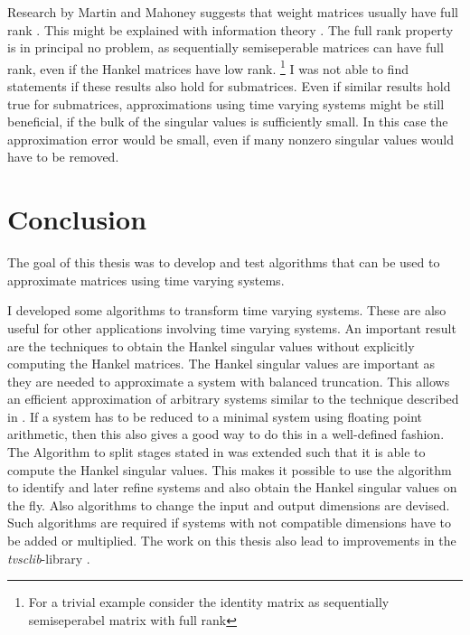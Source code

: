 \documentclass[doctype=mastersthesis,BCOR=15mm,biblatex]{ldvbook}%
\begin{document}
Research by Martin and Mahoney suggests that weight matrices usually have full rank \cite{martin_implicit_2021}.
This might be explained with information theory \cite{papyan_traces_2020}.
The full rank property is in principal no problem, as sequentially semiseperable matrices can have full rank, even if the Hankel matrices have low rank. 
\footnote{For a trivial example consider the identity matrix as sequentially semiseperabel matrix with full rank}
I was not able to find statements if these results also hold for submatrices.
Even if similar results hold true for submatrices, approximations using time varying systems might be still beneficial, if the bulk of the singular values is sufficiently small.
In this case the approximation error would be small, even if many nonzero singular values would have to be removed.




\chapter{Conclusion}\label{chap:conclusion}
The goal of this thesis was to develop and test algorithms that can be used to approximate matrices using time varying systems.

I developed some algorithms to transform time varying systems.
These are also useful for other applications involving time varying systems.
An important result are the techniques to obtain the Hankel singular values without explicitly computing the Hankel matrices.
The Hankel singular values are important as they are needed to approximate a system with balanced truncation.
This allows an efficient approximation of arbitrary systems similar to the technique described in \cite{chandrasekaran_fast_2005}.
If a system has to be reduced to a minimal system using floating point arithmetic, then this also gives a good way to do this in a well-defined fashion.
The Algorithm to split stages stated in \cite{chandrasekaran_fast_2005} was extended such that it is able to compute the Hankel singular values.
This makes it possible to use the algorithm to identify and later refine systems and also obtain the Hankel singular values on the fly.
Also algorithms to change the input and output dimensions are devised. 
Such algorithms are required if systems with not compatible dimensions have to be added or multiplied.
The work on this thesis also lead to improvements in the \emph{tvsclib}-library \cite{kissel_time_2022}.
\end{document}
